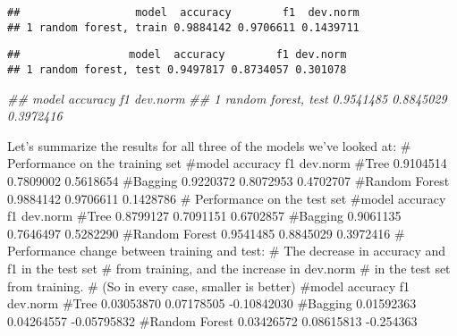 \documentclass[]{article}
\newenvironment{Shaded}{\begin{snugshade}}{\end{snugshade}}
\newcommand{\CommentTok}[1]{\textcolor[rgb]{0.56,0.35,0.01}{\textit{#1}}}
\newcommand{\DataTypeTok}[1]{\textcolor[rgb]{0.13,0.29,0.53}{#1}}
\newcommand{\KeywordTok}[1]{\textcolor[rgb]{0.13,0.29,0.53}{\textbf{#1}}}
\newcommand{\NormalTok}[1]{#1}
\newcommand{\OperatorTok}[1]{\textcolor[rgb]{0.81,0.36,0.00}{\textbf{#1}}}
\newcommand{\StringTok}[1]{\textcolor[rgb]{0.31,0.60,0.02}{#1}}
\begin{document}
\begin{Shaded}
\end{Shaded}

\begin{verbatim}
##                  model  accuracy        f1  dev.norm
## 1 random forest, train 0.9884142 0.9706611 0.1439711
\end{verbatim}

\begin{Shaded}
\end{Shaded}

\begin{verbatim}
##                 model  accuracy        f1 dev.norm
## 1 random forest, test 0.9497817 0.8734057 0.301078
\end{verbatim}

\begin{Shaded}
\begin{Highlighting}[]
\CommentTok{## model accuracy f1 dev.norm}
\CommentTok{## 1 random forest, test 0.9541485 0.8845029 0.3972416}
\end{Highlighting}
\end{Shaded}

Let's summarize the results for all three of the models we've looked at:
\# Performance on the training set \#model accuracy f1 dev.norm \#Tree
0.9104514 0.7809002 0.5618654 \#Bagging 0.9220372 0.8072953 0.4702707
\#Random Forest 0.9884142 0.9706611 0.1428786 \# Performance on the test
set \#model accuracy f1 dev.norm \#Tree 0.8799127 0.7091151 0.6702857
\#Bagging 0.9061135 0.7646497 0.5282290 \#Random Forest 0.9541485
0.8845029 0.3972416 \# Performance change between training and test: \#
The decrease in accuracy and f1 in the test set \# from training, and
the increase in dev.norm \# in the test set from training. \# (So in
every case, smaller is better) \#model accuracy f1 dev.norm \#Tree
0.03053870 0.07178505 -0.10842030 \#Bagging 0.01592363 0.04264557
-0.05795832 \#Random Forest 0.03426572 0.08615813 -0.254363
\end{document}

